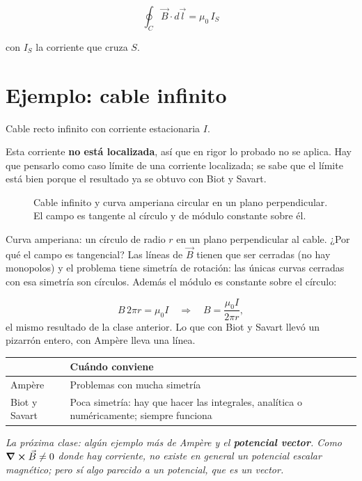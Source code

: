 \documentclass[12pt,a4paper]{article}
\begin{document}
\begin{keybox}
\[
\boxed{\ \oint_C \vec B\cdot d\vec l = \mu_0\,I_S\ }
\]
\end{keybox}
con $I_S$ la corriente que cruza $S$.

\section{Ejemplo: cable infinito}

Cable recto infinito con corriente estacionaria $I$.

\begin{warnbox}[Advertencia]
Esta corriente \textbf{no está localizada}, así que en rigor lo
probado no se aplica. Hay que pensarlo como caso límite de una corriente
localizada; se sabe que el límite está bien porque el resultado ya se obtuvo
con Biot y Savart.
\end{warnbox}

\begin{figure}[H]
  \centering
  
  \caption{Cable infinito y curva amperiana circular en un plano perpendicular. El campo es tangente al círculo y de módulo constante sobre él.}
\end{figure}

Curva amperiana: un círculo de radio $r$ en un plano perpendicular al cable.
¿Por qué el campo es tangencial? Las líneas de $\vec B$ tienen que ser cerradas
(no hay monopolos) y el problema tiene simetría de rotación: las únicas curvas
cerradas con esa simetría son círculos. Además el módulo es constante sobre el
círculo:

\[
B\,2\pi r = \mu_0 I
\quad\Longrightarrow\quad
B = \frac{\mu_0 I}{2\pi r},
\]
el mismo resultado de la clase anterior. Lo que con Biot y Savart llevó un
pizarrón entero, con Ampère lleva una línea.

\begin{center}
\renewcommand{\arraystretch}{1.35}
\small
\begin{tabularx}{\textwidth}{l>{\raggedright\arraybackslash}X}
\toprule
 & \textbf{Cuándo conviene} \\
\midrule
Ampère & Problemas con mucha simetría \\
Biot y Savart & Poca simetría: hay que hacer las integrales, analítica o numéricamente; siempre funciona \\
\bottomrule
\end{tabularx}
\end{center}

\noindent\emph{La próxima clase: algún ejemplo más de Ampère y el \textbf{potencial vector}. Como
$\curl \vec B\neq0$ donde hay corriente, no existe en general un potencial
escalar magnético; pero sí algo parecido a un potencial, que es un vector.}
\end{document}

